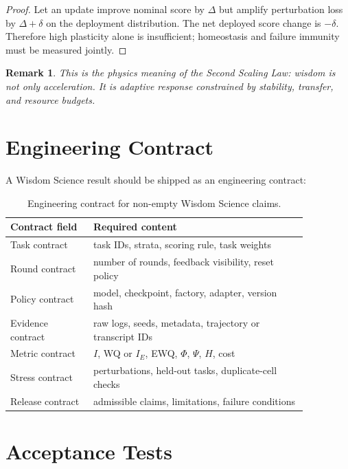\documentclass[11pt]{article}
\newtheorem{remark}{Remark}
\begin{document}
\begin{proof}
Let an update improve nominal score by $\Delta$ but amplify perturbation loss by $\Delta+\delta$ on the deployment distribution.
The net deployed score change is $-\delta$.
Therefore high plasticity alone is insufficient; homeostasis and failure immunity must be measured jointly.
\end{proof}

\begin{remark}
This is the physics meaning of the Second Scaling Law: wisdom is not only acceleration.
It is adaptive response constrained by stability, transfer, and resource budgets.
\end{remark}

\section{Engineering Contract}

A Wisdom Science result should be shipped as an engineering contract:

\begin{table}[t]
\centering
\small
\begin{tabular}{p{0.24\linewidth}p{0.62\linewidth}}
\toprule
Contract field & Required content \\
\midrule
Task contract & task IDs, strata, scoring rule, task weights \\
Round contract & number of rounds, feedback visibility, reset policy \\
Policy contract & model, checkpoint, factory, adapter, version hash \\
Evidence contract & raw logs, seeds, metadata, trajectory or transcript IDs \\
Metric contract & $I$, WQ or $I_E$, EWQ, $\Phi$, $\Psi$, $H$, cost \\
Stress contract & perturbations, held-out tasks, duplicate-cell checks \\
Release contract & admissible claims, limitations, failure conditions \\
\bottomrule
\end{tabular}
\caption{Engineering contract for non-empty Wisdom Science claims.}
\end{table}

\section{Acceptance Tests}
\end{document}
